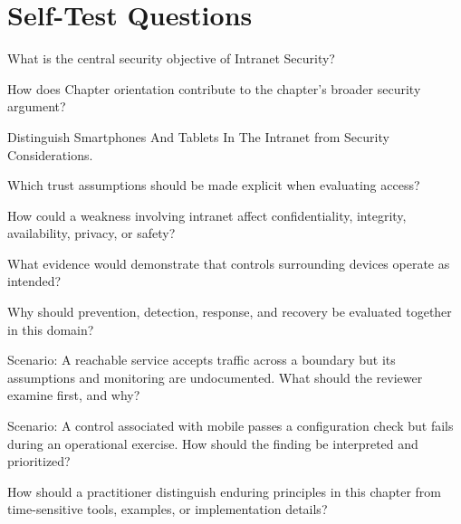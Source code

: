 \documentclass[11pt,letterpaper]{article}
\begin{document}
\section*{Self-Test Questions}
\begin{CornellRecallList}
\item What is the central security objective of Intranet Security?
\item How does Chapter orientation contribute to the chapter's broader security argument?
\item Distinguish Smartphones And Tablets In The Intranet from Security Considerations.
\item Which trust assumptions should be made explicit when evaluating access?
\item How could a weakness involving intranet affect confidentiality, integrity, availability, privacy, or safety?
\item What evidence would demonstrate that controls surrounding devices operate as intended?
\item Why should prevention, detection, response, and recovery be evaluated together in this domain?
\item Scenario: A reachable service accepts traffic across a boundary but its assumptions and monitoring are undocumented. What should the reviewer examine first, and why?
\item Scenario: A control associated with mobile passes a configuration check but fails during an operational exercise. How should the finding be interpreted and prioritized?
\item How should a practitioner distinguish enduring principles in this chapter from time-sensitive tools, examples, or implementation details?
\end{CornellRecallList}
\end{document}
